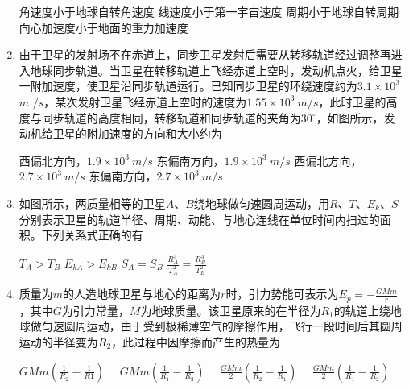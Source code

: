 \begin{enumerate}[leftmargin=0em]
\fourchoices
{角速度小于地球自转角速度}
{线速度小于第一宇宙速度}
{周期小于地球自转周期}
{向心加速度小于地面的重力加速度}



\item 
{}
由于卫星的发射场不在赤道上，同步卫星发射后需要从转移轨道经过调整再进入地球同步轨道。当卫星在转移轨道上飞经赤道上空时，发动机点火，给卫星一附加速度，使卫星沿同步轨道运行。已知同步卫星的环绕速度约为$ 3.1 \times 10^3 $ $ m $ $ /s $，某次发射卫星飞经赤道上空时的速度为$ 1.55 \times 10^3 \ m/s $，此时卫星的高度与同步轨道的高度相同，转移轨道和同步轨道的夹角为$ 30 ^{ \circ } $，如图所示，发动机给卫星的附加速度的方向和大小约为  
\begin{figure}[h!]
\centering

\end{figure}

\fourchoices
{西偏北方向，$ 1.9 \times 10^3 \ m/s $ }
{东偏南方向，$ 1.9 \times 10^3 \ m/s $}
{西偏北方向，$ 2.7 \times 10^3 \ m/s $ }
{东偏南方向，$ 2.7 \times 10^3 \ m/s $}


\item 
{}
如图所示，两质量相等的卫星$ A $、$ B $绕地球做匀速圆周运动，用$ R $、$ T $、$ E_{k} $、$ S $分别表示卫星的轨道半径、周期、动能、与地心连线在单位时间内扫过的面积。下列关系式正确的有  
\begin{figure}[h!]
\centering

\end{figure}

\fourchoices
{$ T_A>T_B $ }
{$ E_{kA} > E_{kB} $}
{$ S_A=S_B $ }
{$\frac { R _ { A } ^ { 3 } } { T _ { A } ^ { 2 } } = \frac { R _ { B } ^ { 3 } } { T _ { B } ^ { 2 } }$}




\item 
{}
质量为$ m $的人造地球卫星与地心的距离为$ r $时，引力势能可表示为$E _ { p } = - \frac { G M m } { r }$，其中$ G $为引力常量，$ M $为地球质量。该卫星原来的在半径为$ R_{1} $的轨道上绕地球做匀速圆周运动，由于受到极稀薄空气的摩擦作用，飞行一段时间后其圆周运动的半径变为$ R_{2} $，此过程中因摩擦而产生的热量为  

\fourchoices
{$G M m \left( \frac { 1 } { R _ { 2 } } - \frac { 1 } { R 1 } \right) \quad$}
{$G M m \left( \frac { 1 } { R _ { 1 } } - \frac { 1 } { R _ { 2 } } \right) \quad$}
{$\frac { G M m } { 2 } \left( \frac { 1 } { R _ { 2 } } - \frac { 1 } { R _ { 1 } } \right) \quad$}
{$\frac { G M m } { 2 } \left( \frac { 1 } { R _ { 1 } } - \frac { 1 } { R _ { 2 } } \right)$}




\end{enumerate}
